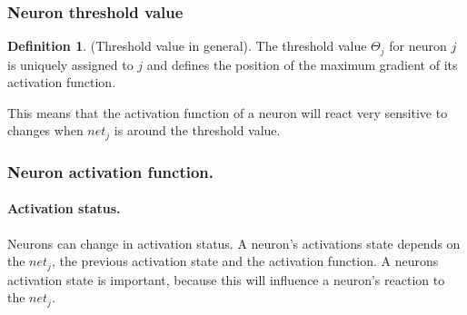 \documentclass[pdftex,a4paper,12pt,twoside]{report}
\theoremstyle{plain} \newtheorem{theorem}{Theorem} \newtheorem{proposition}{Proposition} \newtheorem{lemma}{Lemma} \newtheorem*{corollary}{Corollary}
\theoremstyle{definition} \newtheorem{definition}{Definition} \newtheorem{conjecture}{Conjecture} \newtheorem*{example}{Example} \newtheorem{algorithm}{Algorithm}
\theoremstyle{remark} \newtheorem*{remark}{Remark} \newtheorem*{note}{Note} \newtheorem{case}{Case}
\begin{document}
\subsubsection{Neuron threshold value}
\begin{definition}
(Threshold value in general). The threshold value $\Theta_j$ for neuron $j$ is uniquely assigned to $j$ and defines the position of the maximum gradient of its activation function.
\end{definition}
This means that the activation function of a neuron will react very sensitive to changes when $net_j$ is around the threshold value. 
\subsubsection{Neuron activation function.}
\paragraph{Activation status.}Neurons can change in activation status. A neuron's activations state depends on the $net_j$, the previous activation state and the activation function. A neurons activation state is important, because this will influence a neuron's reaction to the $net_j$.
\end{document}
